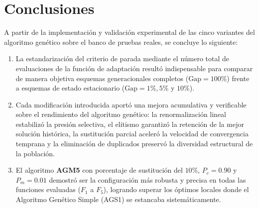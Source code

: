 \documentclass[11pt,letterpaper]{article}
\begin{document}
\section{Conclusiones}
A partir de la implementación y validación experimental de las cinco variantes del algoritmo genético sobre el banco de pruebas reales, se concluye lo siguiente:
\begin{enumerate}
    \item La estandarización del criterio de parada mediante el número total de evaluaciones de la función de adaptación resultó indispensable para comparar de manera objetiva esquemas generacionales completos ($\text{Gap} = 100\%$) frente a esquemas de estado estacionario ($\text{Gap} = 1\%, 5\%$ y $10\%$).
    \item Cada modificación introducida aportó una mejora acumulativa y verificable sobre el rendimiento del algoritmo genético: la renormalización lineal estabilizó la presión selectiva, el elitismo garantizó la retención de la mejor solución histórica, la sustitución parcial aceleró la velocidad de convergencia temprana y la eliminación de duplicados preservó la diversidad estructural de la población.
    \item El algoritmo \textbf{AGM5} con porcentaje de sustitución del $10\%$, $P_c = 0.90$ y $P_m = 0.01$ demostró ser la configuración más robusta y precisa en todas las funciones evaluadas ($F_1$ a $F_5$), logrando superar los óptimos locales donde el Algoritmo Genético Simple (AGS1) se estancaba sistemáticamente.
\end{enumerate}
\end{document}
